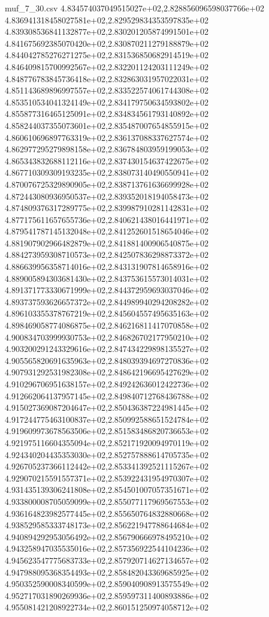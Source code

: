 \begin{filecontents*}{muf_7_30.csv}
4.834574037049515027e+02,2.828856096598037766e+02
4.836941318458027581e+02,2.829529834353597835e+02
4.839308536841132877e+02,2.830201205874991501e+02
4.841675692385070420e+02,2.830870211279188879e+02
4.844042785276271275e+02,2.831536850682914519e+02
4.846409815700992567e+02,2.832201124203111249e+02
4.848776783845736418e+02,2.832863031957022031e+02
4.851143689896997557e+02,2.833522574061744308e+02
4.853510534041324149e+02,2.834179750634593802e+02
4.855877316465125091e+02,2.834834561793140892e+02
4.858244037355073601e+02,2.835487007654855915e+02
4.860610696897763319e+02,2.836137088337627574e+02
4.862977295279898158e+02,2.836784803959199053e+02
4.865343832688112116e+02,2.837430154637422675e+02
4.867710309309193235e+02,2.838073140490550941e+02
4.870076725329890905e+02,2.838713761636699928e+02
4.872443080936950537e+02,2.839352018194058473e+02
4.874809376317289775e+02,2.839987910281142831e+02
4.877175611657655736e+02,2.840621438016441971e+02
4.879541787145132048e+02,2.841252601518654046e+02
4.881907902966482879e+02,2.841881400906540875e+02
4.884273959308710573e+02,2.842507836298873372e+02
4.886639956358714016e+02,2.843131907814658916e+02
4.889005894303681430e+02,2.843753615573014031e+02
4.891371773330671999e+02,2.844372959693037046e+02
4.893737593626657372e+02,2.844989940294208282e+02
4.896103355378767219e+02,2.845604557495635163e+02
4.898469058774086875e+02,2.846216811417070858e+02
4.900834703999930753e+02,2.846826702177950210e+02
4.903200291243329616e+02,2.847434229898135527e+02
4.905565820691635963e+02,2.848039394697270836e+02
4.907931292531982308e+02,2.848642196695427629e+02
4.910296706951638157e+02,2.849242636012422736e+02
4.912662064137957145e+02,2.849840712768436788e+02
4.915027369087204647e+02,2.850436387224981445e+02
4.917244775463100837e+02,2.850992588651524784e+02
4.919609973678563506e+02,2.851583486820736653e+02
4.921975116604355094e+02,2.852171920094970119e+02
4.924340204435353030e+02,2.852757888614705735e+02
4.926705237366112442e+02,2.853341392521115267e+02
4.929070215591557371e+02,2.853922431954970307e+02
4.931435139306241808e+02,2.854501007057351671e+02
4.933800008705059099e+02,2.855077117969567553e+02
4.936164823982577445e+02,2.855650764832880668e+02
4.938529585333748173e+02,2.856221947788644684e+02
4.940894292953056492e+02,2.856790666978495210e+02
4.943258947035535016e+02,2.857356922544104236e+02
4.945623547775683733e+02,2.857920714627134657e+02
4.947988095368354493e+02,2.858482043369685925e+02
4.950352590008340599e+02,2.859040908913575549e+02
4.952717031890269936e+02,2.859597311400893886e+02
4.955081421208922734e+02,2.860151250974058712e+02

\end{filecontents*}
